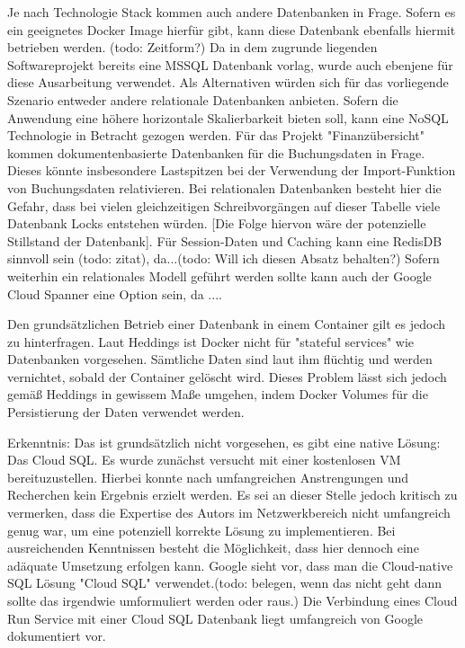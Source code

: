 \documentclass[pdftex,a4paper,abstracton,11pt,parskip=half,bibtotocnumbered]{scrartcl}
\begin{document}
		
		Je nach Technologie Stack kommen auch andere Datenbanken in Frage. Sofern es ein geeignetes Docker Image hierfür gibt, kann diese Datenbank ebenfalls hiermit betrieben werden. (todo: Zeitform?) Da in dem zugrunde liegenden Softwareprojekt bereits eine MSSQL Datenbank vorlag, wurde auch ebenjene für diese Ausarbeitung verwendet. Als Alternativen würden sich für das vorliegende Szenario entweder andere relationale Datenbanken anbieten. Sofern die Anwendung eine höhere horizontale Skalierbarkeit bieten soll, kann eine NoSQL Technologie in Betracht gezogen werden. Für das Projekt "Finanzübersicht" kommen dokumentenbasierte Datenbanken für die Buchungsdaten in Frage. Dieses könnte insbesondere Lastspitzen bei der Verwendung der Import-Funktion von Buchungsdaten relativieren. Bei relationalen Datenbanken besteht hier die Gefahr, dass bei vielen gleichzeitigen Schreibvorgängen auf dieser Tabelle viele Datenbank Locks entstehen würden. [Die Folge hiervon wäre der potenzielle Stillstand der Datenbank]. Für Session-Daten und Caching kann eine RedisDB sinnvoll sein (todo: zitat), da...(todo: Will ich diesen Absatz behalten?) Sofern weiterhin ein relationales Modell geführt werden sollte kann auch der Google Cloud Spanner eine Option sein, da .... 
		
		Den grundsätzlichen Betrieb einer Datenbank in einem Container gilt es jedoch zu hinterfragen. Laut Heddings ist Docker nicht für "stateful services"\cite[vgl.][]{heddings_2020} wie Datenbanken vorgesehen. Sämtliche Daten sind laut ihm flüchtig und werden vernichtet, sobald der Container gelöscht wird. Dieses Problem lässt sich jedoch gemäß Heddings in gewissem Maße umgehen, indem Docker Volumes für die Persistierung der Daten verwendet werden.\cite[vgl.][]{heddings_2020}
		
		
	
		Erkenntnis: Das ist grundsätzlich nicht vorgesehen, es gibt eine native Lösung: Das Cloud SQL. Es wurde zunächst versucht mit einer kostenlosen
		VM bereituzustellen. Hierbei konnte nach umfangreichen Anstrengungen und Recherchen kein Ergebnis erzielt werden. Es sei an dieser Stelle jedoch
		kritisch zu vermerken, dass die Expertise des Autors im Netzwerkbereich nicht umfangreich genug war, um eine potenziell korrekte Lösung zu implementieren.
		Bei ausreichenden Kenntnissen besteht die Möglichkeit, dass hier dennoch eine adäquate Umsetzung erfolgen kann. Google sieht vor, dass man die
		Cloud-native SQL Lösung "Cloud SQL" verwendet.(todo: belegen, wenn das nicht geht dann sollte das irgendwie umformuliert werden oder raus.)
		Die Verbindung eines Cloud Run Service mit einer Cloud SQL Datenbank liegt umfangreich von Google dokumentiert vor. 
\end{document}
